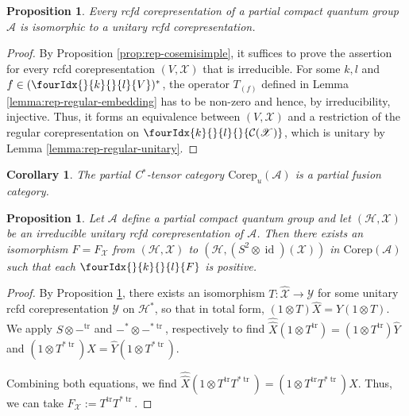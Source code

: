 \documentclass[10pt]{article}
\DeclareMathOperator{\id}{id}
\DeclareMathOperator{\tr}{\mathrm{tr}}
\newcommand{\dual}[1]{#1^{*}}
\newcommand{\dualop}[1]{#1^{\tr}}
\newcommand{\dualco}[1]{\hat{#1}}
\newcommand{\Corep}{\mathrm{Corep}}
\newcommand{\Hsp}{\mathcal{H}}
\newcommand{\Gr}[5]{\fourIdx{#2}{#4}{#3}{#5}{#1}}%
\newcommand{\Gru}[3]{\Gr{#1}{}{}{#2}{#3}}
\newcommand{\Grd}[3]{\Gr{#1}{#2}{#3}{}{}}
\newtheorem{Prop}[Theorem]{Proposition}
\newtheorem{Cor}[Theorem]{Corollary}
\theoremstyle{definition}
\numberwithin{equation}{section}
\begin{document}
\begin{Prop} \label{prop:rep-unitarisable} Every  rcfd
  corepresentation of a partial compact quantum group $\mathscr{A}$ is
  isomorphic to a unitary rcfd corepresentation.
\end{Prop}
\begin{proof}
  By Proposition \ref{prop:rep-cosemisimple}, it suffices to prove the
  assertion for every rcfd corepresentation $(V,\mathscr{X})$ that is
  irreducible.  For some $k,l$ and $f \in
  \dual{(\Gru{V}{k}{l})}$, the operator $T_{(f)}$ defined in
  Lemma \ref{lemma:rep-regular-embedding} has to be non-zero and
  hence, by irreducibility, injective. Thus, it forms an equivalence
  between $(V,\mathscr{X})$ and a restriction of the regular
  corepresentation on $\Grd{\mathcal{C}(\mathscr{X})}{k}{l}$, which is
  unitary by Lemma \ref{lemma:rep-regular-unitary}.
\end{proof}
\begin{Cor} The partial C$^*$-tensor category $\Corep_u(\mathscr{A})$ is a partial fusion category.
\end{Cor}

\begin{Prop} \label{prop:rep-unitary-bidual}
  Let $\mathscr{A}$ define a partial compact quantum group and let
  $(\Hsp,\mathscr{X})$ be an irreducible unitary rcfd corepresentation of
  $\mathscr{A}$.  Then there exists an isomorphism $F=F_{\mathscr{X}}$
  from $(\Hsp,\mathscr{X})$ to 
  $(\Hsp,(S^{2} \otimes \id)(\mathscr{X}))$ in $\Corep(\mathscr{A})$ such
  that each $\Gru{F}{k}{l}$ is positive.
\end{Prop}
\begin{proof}
 By Proposition \ref{prop:rep-unitarisable}, there exists an
  isomorphism $T \colon \dualco{\mathscr{X}} \to \mathscr{Y}$ for some
  unitary rcfd corepresentation $\mathscr{Y}$ on $\dual{\Hsp}$, so that in total form,
  $(1\otimes T)\dualco{X} = Y(1 \otimes T)$.
We  apply   $S \otimes -^{\tr}$ and $-^{*} \otimes -^{*\tr}$,
respectively to find $ \dualco{\dualco{X}}(1 \otimes \dualop{T}) = (1 \otimes
  \dualop{T})\dualco{Y}$ and $(1 \otimes T^{*\tr})X=\dualco{Y}(1\otimes T^{*\tr}).$

Combining both equations, we
find $\dualco{\dualco{X}}(1 \otimes \dualop{T}T^{*\tr})=(1 \otimes
\dualop{T}T^{*\tr})X$. Thus, we can take
$F_{\mathscr{X}}:=\dualop{T}T^{*\tr}$.
\end{proof}
\end{document}
